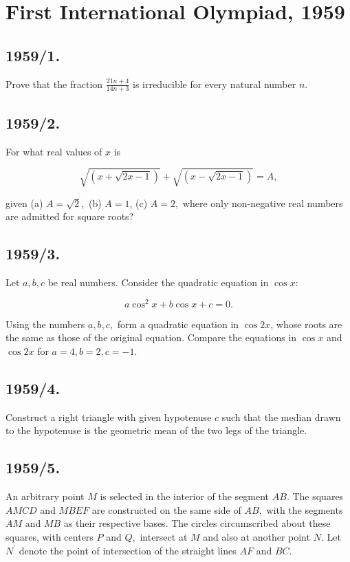 \documentclass[12pt,thmsa]{article}
\begin{document}
\section{First International Olympiad, 1959}

\subsection{1959/1.}

Prove that the fraction $\frac{21n+4}{14n+3}$ is irreducible for every
natural number $n.$

\subsection{1959/2.}

For what real values of $x$ is

\[
\sqrt{(x+\sqrt{2x-1})}+\sqrt{(x-\sqrt{2x-1})}=A,
\]

given (a) $A=\sqrt{2},$ (b) $A=1$, (c) $A=2,$ where only non-negative real
numbers are admitted for square roots?

\subsection{1959/3.}

Let $a,b,c$ be real numbers. Consider the quadratic equation in $\cos x:$

\[
a\cos ^{2}x+b\cos x+c=0.
\]

Using the numbers $a,b,c,$ form a quadratic equation in $\cos 2x$, whose
roots are the same as those of the original equation. Compare the equations
in $\cos x$ and $\cos 2x$ for $a=4,b=2,c=-1.$

\subsection{1959/4.}

Construct a right triangle with given hypotenuse $c$ such that the median
drawn to the hypotenuse is the geometric mean of the two legs of the
triangle.

\subsection{1959/5.}

An arbitrary point $M$ is selected in the interior of the segment $AB.$ The
squares $AMCD$ and $MBEF$ are constructed on the same side of $AB,$ with the
segments $AM$ and $MB$ as their respective bases. The circles circumscribed
about these squares, with centers $P$ and $Q,$ intersect at $M$ and also at
another point $N.$ Let $N^{\prime }$ denote the point of intersection of the
straight lines $AF$ and $BC.$
\end{document}
